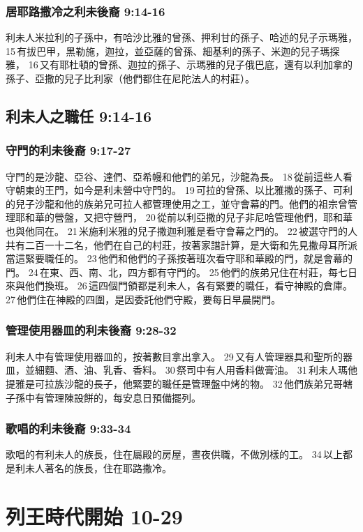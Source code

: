 \subsubsection{居耶路撒冷之利未後裔 9:14-16}
利未人米拉利的子孫中，有哈沙比雅的曾孫、押利甘的孫子、哈述的兒子示瑪雅， 15 有拔巴甲，黑勒施，迦拉，並亞薩的曾孫、細基利的孫子、米迦的兒子瑪探雅， 16 又有耶杜頓的曾孫、迦拉的孫子、示瑪雅的兒子俄巴底，還有以利加拿的孫子、亞撒的兒子比利家（他們都住在尼陀法人的村莊）。

\subsection{利未人之職任 9:14-16}
\subsubsection{守門的利未後裔 9:17-27}
守門的是沙龍、亞谷、達們、亞希幔和他們的弟兄，沙龍為長。 18 從前這些人看守朝東的王門，如今是利未營中守門的。 19 可拉的曾孫、以比雅撒的孫子、可利的兒子沙龍和他的族弟兄可拉人都管理使用之工，並守會幕的門。他們的祖宗曾管理耶和華的營盤，又把守營門， 20 從前以利亞撒的兒子非尼哈管理他們，耶和華也與他同在。 21 米施利米雅的兒子撒迦利雅是看守會幕之門的。 22 被選守門的人共有二百一十二名，他們在自己的村莊，按著家譜計算，是大衛和先見撒母耳所派當這緊要職任的。 23 他們和他們的子孫按著班次看守耶和華殿的門，就是會幕的門。 24 在東、西、南、北，四方都有守門的。 25 他們的族弟兄住在村莊，每七日來與他們換班。 26 這四個門領都是利未人，各有緊要的職任，看守神殿的倉庫。 27 他們住在神殿的四圍，是因委託他們守殿，要每日早晨開門。

\subsubsection{管理使用器皿的利未後裔 9:28-32}
利未人中有管理使用器皿的，按著數目拿出拿入。 29 又有人管理器具和聖所的器皿，並細麵、酒、油、乳香、香料。 30 祭司中有人用香料做膏油。 31 利未人瑪他提雅是可拉族沙龍的長子，他緊要的職任是管理盤中烤的物。 32 他們族弟兄哥轄子孫中有管理陳設餅的，每安息日預備擺列。


\subsubsection{歌唱的利未後裔 9:33-34}
歌唱的有利未人的族長，住在屬殿的房屋，晝夜供職，不做別樣的工。 34 以上都是利未人著名的族長，住在耶路撒冷。

\section{列王時代開始 10-29 }

